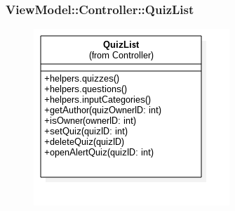 \subsubsection{ViewModel::Controller::QuizList}
\begin{figure}[h!]
\begin{center}
	\includegraphics[scale=0.6]{../images/ViewModel/Controller/QuizList.png}
\end{center}
\end{figure}
